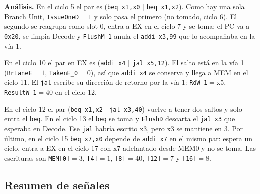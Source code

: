 \documentclass[12pt,a4paper]{article}
\begin{document}
\textbf{Análisis.} En el ciclo 5 el par es (\texttt{beq x1,x0} | \texttt{beq x1,x2}). Como hay una sola Branch Unit, \texttt{IssueOneD}$=1$ y solo pasa el primero (no tomado, ciclo 6). El segundo se reagrupa como slot 0, entra a EX en el ciclo 7 y se toma: el PC va a \texttt{0x20}, se limpia Decode y \texttt{FlushM\_1} anula el \texttt{addi x3,99} que lo acompañaba en la vía 1.

En el ciclo 10 el par en EX es (\texttt{addi x4} | \texttt{jal x5,12}). El salto está en la vía 1 (\texttt{BrLaneE}$=1$, \texttt{TakenE\_0}$=0$), así que \texttt{addi x4} se conserva y llega a MEM en el ciclo 11. El \texttt{jal} escribe su dirección de retorno por la vía 1: \texttt{RdW\_1}$=$x5, \texttt{ResultW\_1}$=40$ en el ciclo 12.

En el ciclo 12 el par (\texttt{beq x1,x2} | \texttt{jal x3,40}) vuelve a tener dos saltos y solo entra el \texttt{beq}. En el ciclo 13 el \texttt{beq} se toma y \texttt{FlushD} descarta el \texttt{jal x3} que esperaba en Decode. Ese \texttt{jal} habría escrito x3, pero x3 se mantiene en 3. Por último, en el ciclo 15 \texttt{beq x7,x0} depende de \texttt{addi x7} en el mismo par: espera un ciclo, entra a EX en el ciclo 17 con x7 adelantado desde MEM0 y no se toma. Las escrituras son \texttt{MEM[0]}$=3$, \texttt{[4]}$=1$, \texttt{[8]}$=40$, \texttt{[12]}$=7$ y \texttt{[16]}$=8$.

\FloatBarrier

\subsection{Resumen de señales}
\end{document}

